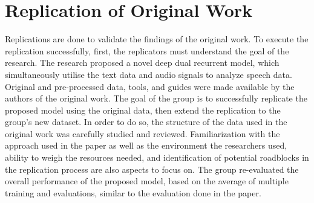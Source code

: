\documentclass{article}
\begin{document}
\section{Replication of Original Work}
    Replications are done to validate the findings of the original work. To execute the replication successfully, first, the replicators must understand the goal of the research. The research proposed a novel deep dual recurrent model, which simultaneously utilise the text data and audio signals to analyze speech data. Original and pre-processed data, tools, and guides were made available by the authors of the original work. The goal of the group is to successfully replicate the proposed model using the original data, then extend the replication to the group's new dataset. In order to do so, the structure of the data used in the original work was carefully studied and reviewed. Familiarization with the approach used in the paper as well as the environment the researchers used, ability to weigh the resources needed, and identification of potential roadblocks in the replication process are also aspects to focus on. The group re-evaluated the overall performance of the proposed model, based on the average of multiple training and evaluations, similar to the evaluation done in the paper.
\end{document}
